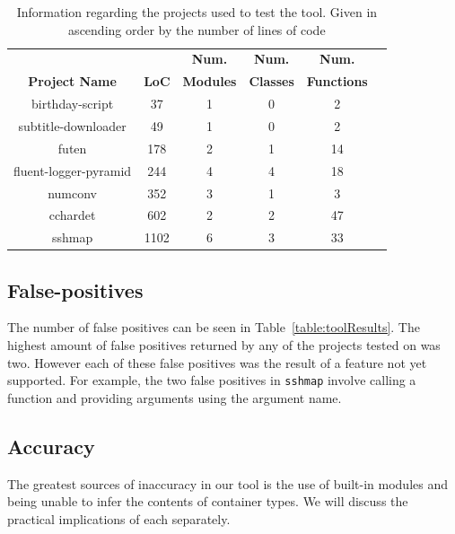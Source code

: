 \documentclass[12pt, titlepage]{article}
\begin{document}
	\begin{table}
	\centering
    \begin{tabular}{ | c | c | c | c | c | c |}
    \hline
     &  & \textbf{Num.} & \textbf{Num.}  & \textbf{Num.}  \\
    \textbf{Project Name} & \textbf{LoC} & \textbf{Modules} & \textbf{Classes} & \textbf{Functions} \\ \hline
    birthday-script & 37 & 1 & 0 & 2 \\ \hline
    subtitle-downloader & 49 & 1 & 0 & 2 \\ \hline
    futen & 178 & 2 & 1 & 14 \\ \hline
    fluent-logger-pyramid & 244 & 4 & 4 & 18 \\ \hline
    numconv & 352 & 3 & 1 & 3 \\ \hline
    cchardet & 602 & 2 & 2 & 47  \\ \hline
    sshmap & 1102 & 6 & 3 & 33 \\ \hline
    \end{tabular}
    \caption{Information regarding the projects used to test the tool. Given in ascending order by the number of lines of code}
	\label{table:toolTests}
    \end{table}
    


\subsection{False-positives}
The number of false positives can be seen in Table~\ref{table:toolResults}. The highest amount of false positives returned by any of the projects tested on was two. However each of these false positives was the result of a feature not yet supported. For example, the two false positives in \texttt{sshmap} involve calling a function and providing arguments using the argument name.

\subsection{Accuracy}
The greatest sources of inaccuracy in our tool is the use of built-in modules and being unable to infer the contents of container types. We will discuss the practical implications of each separately.
\end{document}
